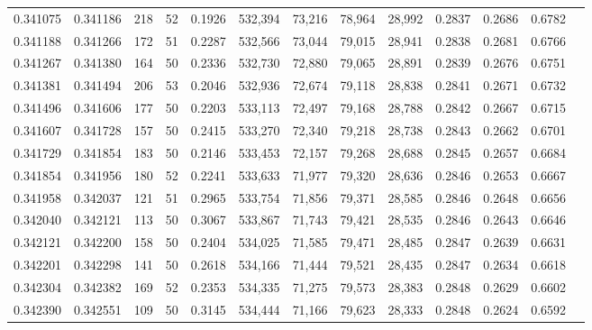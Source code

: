 \begin{tabular}{rrrrrrrrrrrrr}
0.341075 & 0.341186 &   218 &  52 &                                     0.1926 & 532,394 &  73,216 &  78,964 &  28,992 & 0.2837 & 0.2686 & 0.6782 \\
0.341188 & 0.341266 &   172 &  51 &                                     0.2287 & 532,566 &  73,044 &  79,015 &  28,941 & 0.2838 & 0.2681 & 0.6766 \\
0.341267 & 0.341380 &   164 &  50 &                                     0.2336 & 532,730 &  72,880 &  79,065 &  28,891 & 0.2839 & 0.2676 & 0.6751 \\
0.341381 & 0.341494 &   206 &  53 &                                     0.2046 & 532,936 &  72,674 &  79,118 &  28,838 & 0.2841 & 0.2671 & 0.6732 \\
0.341496 & 0.341606 &   177 &  50 &                                     0.2203 & 533,113 &  72,497 &  79,168 &  28,788 & 0.2842 & 0.2667 & 0.6715 \\
0.341607 & 0.341728 &   157 &  50 &                                     0.2415 & 533,270 &  72,340 &  79,218 &  28,738 & 0.2843 & 0.2662 & 0.6701 \\
0.341729 & 0.341854 &   183 &  50 &                                     0.2146 & 533,453 &  72,157 &  79,268 &  28,688 & 0.2845 & 0.2657 & 0.6684 \\
0.341854 & 0.341956 &   180 &  52 &                                     0.2241 & 533,633 &  71,977 &  79,320 &  28,636 & 0.2846 & 0.2653 & 0.6667 \\
0.341958 & 0.342037 &   121 &  51 &                                     0.2965 & 533,754 &  71,856 &  79,371 &  28,585 & 0.2846 & 0.2648 & 0.6656 \\
0.342040 & 0.342121 &   113 &  50 &                                     0.3067 & 533,867 &  71,743 &  79,421 &  28,535 & 0.2846 & 0.2643 & 0.6646 \\
0.342121 & 0.342200 &   158 &  50 &                                     0.2404 & 534,025 &  71,585 &  79,471 &  28,485 & 0.2847 & 0.2639 & 0.6631 \\
0.342201 & 0.342298 &   141 &  50 &                                     0.2618 & 534,166 &  71,444 &  79,521 &  28,435 & 0.2847 & 0.2634 & 0.6618 \\
0.342304 & 0.342382 &   169 &  52 &                                     0.2353 & 534,335 &  71,275 &  79,573 &  28,383 & 0.2848 & 0.2629 & 0.6602 \\
0.342390 & 0.342551 &   109 &  50 &                                     0.3145 & 534,444 &  71,166 &  79,623 &  28,333 & 0.2848 & 0.2624 & 0.6592 \\

\end{tabular}
